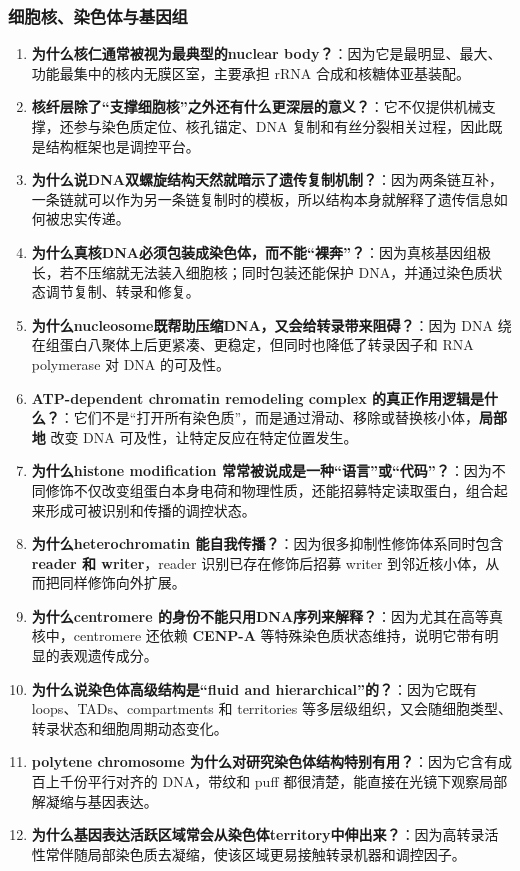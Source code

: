 \documentclass[12pt,fontset=none]{ctexart}
\begin{document}
\subsubsection*{细胞核、染色体与基因组}
\begin{enumerate}
\item \textbf{为什么核仁通常被视为最典型的nuclear body？}：因为它是最明显、最大、功能最集中的核内无膜区室，主要承担 rRNA 合成和核糖体亚基装配。

\item \textbf{核纤层除了“支撑细胞核”之外还有什么更深层的意义？}：它不仅提供机械支撑，还参与染色质定位、核孔锚定、DNA 复制和有丝分裂相关过程，因此既是结构框架也是调控平台。

\item \textbf{为什么说DNA双螺旋结构天然就暗示了遗传复制机制？}：因为两条链互补，一条链就可以作为另一条链复制时的模板，所以结构本身就解释了遗传信息如何被忠实传递。

\item \textbf{为什么真核DNA必须包装成染色体，而不能“裸奔”？}：因为真核基因组极长，若不压缩就无法装入细胞核；同时包装还能保护 DNA，并通过染色质状态调节复制、转录和修复。

\item \textbf{为什么nucleosome既帮助压缩DNA，又会给转录带来阻碍？}：因为 DNA 绕在组蛋白八聚体上后更紧凑、更稳定，但同时也降低了转录因子和 RNA polymerase 对 DNA 的可及性。

\item \textbf{ATP-dependent chromatin remodeling complex 的真正作用逻辑是什么？}：它们不是“打开所有染色质”，而是通过滑动、移除或替换核小体，\textbf{局部地} 改变 DNA 可及性，让特定反应在特定位置发生。

\item \textbf{为什么histone modification 常常被说成是一种“语言”或“代码”？}：因为不同修饰不仅改变组蛋白本身电荷和物理性质，还能招募特定读取蛋白，组合起来形成可被识别和传播的调控状态。

\item \textbf{为什么heterochromatin 能自我传播？}：因为很多抑制性修饰体系同时包含 \textbf{reader 和 writer}，reader 识别已存在修饰后招募 writer 到邻近核小体，从而把同样修饰向外扩展。

\item \textbf{为什么centromere 的身份不能只用DNA序列来解释？}：因为尤其在高等真核中，centromere 还依赖 \textbf{CENP-A} 等特殊染色质状态维持，说明它带有明显的表观遗传成分。

\item \textbf{为什么说染色体高级结构是“fluid and hierarchical”的？}：因为它既有 loops、TADs、compartments 和 territories 等多层级组织，又会随细胞类型、转录状态和细胞周期动态变化。

\item \textbf{polytene chromosome 为什么对研究染色体结构特别有用？}：因为它含有成百上千份平行对齐的 DNA，带纹和 puff 都很清楚，能直接在光镜下观察局部解凝缩与基因表达。

\item \textbf{为什么基因表达活跃区域常会从染色体territory中伸出来？}：因为高转录活性常伴随局部染色质去凝缩，使该区域更易接触转录机器和调控因子。

\end{enumerate}
\end{document}
